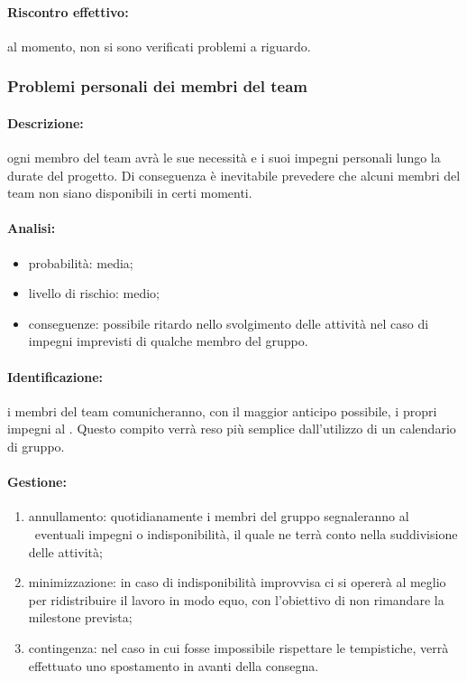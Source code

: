 \documentclass[../PianoProgetto.tex]{subfiles}
\begin{document}
	\paragraph*{Riscontro effettivo:} al momento, non si sono verificati problemi a riguardo.

\subsubsection{Problemi personali dei membri del team}

	\paragraph*{Descrizione:} ogni membro del team avrà le sue necessità e i suoi impegni personali lungo la durate del progetto. Di conseguenza è inevitabile prevedere che alcuni membri del team non siano disponibili in certi momenti.
	 
	\paragraph*{Analisi:}
	\begin{itemize}
		\item probabilità: media;
		\item livello di rischio: medio;
		\item conseguenze: possibile ritardo nello svolgimento delle attività nel caso di impegni imprevisti di qualche membro del gruppo.
	\end{itemize}	
		
	\paragraph*{Identificazione:} i membri del team comunicheranno, con il maggior anticipo possibile, i propri impegni al \responsabilediprogetto . Questo compito verrà reso più semplice dall'utilizzo di un calendario di gruppo. 
	
	\paragraph*{Gestione:}
	\begin{enumerate}
		\item annullamento: quotidianamente i membri del gruppo segnaleranno al \responsabilediprogetto\ eventuali impegni o indisponibilità, il quale ne terrà conto nella suddivisione delle attività;
		\item minimizzazione: in caso di indisponibilità improvvisa ci si opererà al meglio per ridistribuire il lavoro in modo equo, con l'obiettivo di non rimandare la milestone prevista;
		\item contingenza: nel caso in cui fosse impossibile rispettare le tempistiche, verrà effettuato uno spostamento in avanti della consegna.
	\end{enumerate}
			
\end{document}
